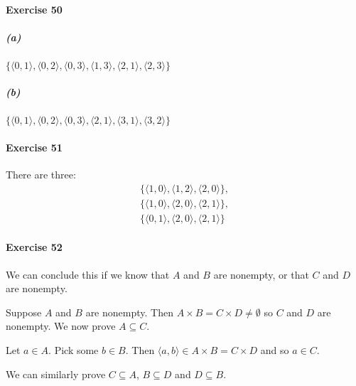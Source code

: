 \documentclass{report}
\begin{document}
    \paragraph{Exercise 50}
    \subparagraph{(a)}
    $\{ \langle 0,1 \rangle, \langle 0,2 \rangle, \langle 0,3 \rangle, \langle 1,3 \rangle,
    \langle 2,1 \rangle, \langle 2,3 \rangle \}$
    \subparagraph{(b)}
    $\{ \langle 0,1 \rangle, \langle 0,2 \rangle, \langle 0,3 \rangle,
    \langle 2,1 \rangle, \langle 3,1 \rangle, \langle 3,2 \rangle \}$

    \paragraph{Exercise 51}
    There are three:
    \begin{align*}
        \{ \langle 1,0 \rangle, \langle 1,2 \rangle, \langle 2,0 \rangle \}, \\
        \{ \langle 1,0 \rangle, \langle 2,0 \rangle, \langle 2,1 \rangle \}, \\
        \{ \langle 0,1 \rangle, \langle 2,0 \rangle, \langle 2,1 \rangle \}
    \end{align*}

    \paragraph{Exercise 52}
    We can conclude this if we know that $A$ and $B$ are nonempty, or that $C$ and $D$ are nonempty.

    Suppose $A$ and $B$ are nonempty. Then $A \times B = C \times D \neq \emptyset$ so $C$ and $D$ are nonempty.
    We now prove $A \subseteq C$.

    Let $a \in A$. Pick some $b \in B$. Then $\langle a,b \rangle \in A \times B = C \times D$ and so $a \in C$.

    We can similarly prove $C \subseteq A$, $B \subseteq D$ and $D \subseteq B$.
\end{document}
